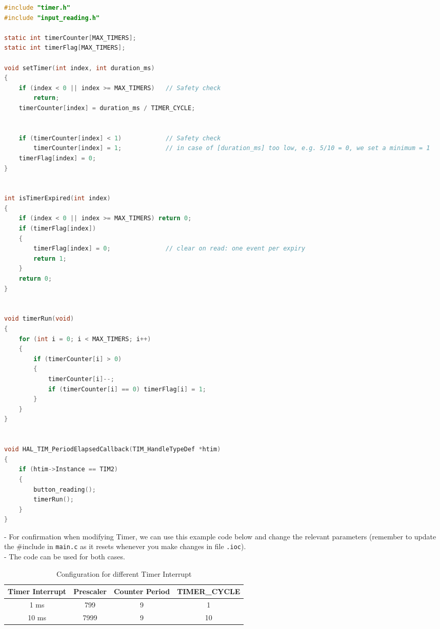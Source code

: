 
\vspace{1em}
\begin{lstlisting}[language=c,caption={Add-on for timer.c}]
#include "timer.h"
#include "input_reading.h"

static int timerCounter[MAX_TIMERS];
static int timerFlag[MAX_TIMERS];

void setTimer(int index, int duration_ms)
{
    if (index < 0 || index >= MAX_TIMERS)	// Safety check
    	return;
    timerCounter[index] = duration_ms / TIMER_CYCLE;


    if (timerCounter[index] < 1)			// Safety check
    	timerCounter[index] = 1;			// in case of [duration_ms] too low, e.g. 5/10 = 0, we set a minimum = 1
    timerFlag[index] = 0;
}


int isTimerExpired(int index)
{
    if (index < 0 || index >= MAX_TIMERS) return 0;
    if (timerFlag[index])
    {
        timerFlag[index] = 0;				// clear on read: one event per expiry
        return 1;
    }
    return 0;
}


void timerRun(void)
{
    for (int i = 0; i < MAX_TIMERS; i++)
    {
        if (timerCounter[i] > 0)
        {
            timerCounter[i]--;
            if (timerCounter[i] == 0) timerFlag[i] = 1;
        }
    }
}


void HAL_TIM_PeriodElapsedCallback(TIM_HandleTypeDef *htim)
{
    if (htim->Instance == TIM2)
    {
        button_reading();
        timerRun();
    }
}

\end{lstlisting}


\vspace{1em}
- For confirmation when modifying Timer, we can use this example code below and change the relevant parameters (remember to update the \#include in \texttt{main.c} as it resets whenever you make changes in file \texttt{.ioc}).\\

- The code can be used for both cases.\\

\begin{table}[H]
    \centering
    \caption{Configuration for different Timer Interrupt}
    \label{tab:timer_config}
    \begin{tabular}{|c|c|c|c|}
        \hline
        \textbf{Timer Interrupt} & \textbf{Prescaler} & \textbf{Counter Period} & \textbf{TIMER\_CYCLE} \\
        \hline
        1 ms & 799 & 9 & 1 \\
        \hline
        10 ms & 7999 & 9 & 10 \\
        \hline
    \end{tabular}
\end{table}

